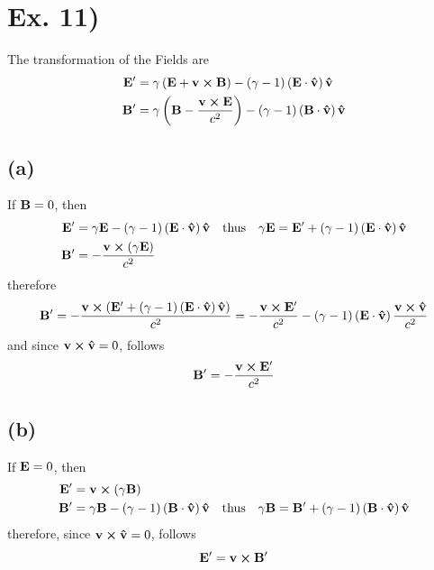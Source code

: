 \documentclass[oneside, 10pt, notitlepage]{book}
\begin{document}
\section*{Ex. 11)}

The transformation of the Fields are
\begin{equation}
\begin{split}
    \vb{E}' &= \gamma \left(\vb{E} + \vb{v}\cross \vb{B}\right) - (\gamma-1)\left(\vb{E}\cdot \vu{v}\right)\vu{v} \\
    \vb{B}' &= \gamma \left(\vb{B}-\frac{\vb{v}\cross\vb{E}}{c^2}\right)-(\gamma-1)\left(\vb{B}\cdot\vu{v}\right)\vu{v}
\end{split}
\end{equation}
\subsection*{(a)}
If \(\vb{B}=0\), then
\begin{equation}
\begin{split}
    \vb{E}' &= \gamma \vb{E} - (\gamma-1)\lr{\vb{E}\cdot \vu{v}}\vu{v} \qq{thus} \gamma \vb{E} = \vb{E}'+ (\gamma-1)\lr{\vb{E}\cdot \vu{v}}\vu{v} \\
    \vb{B}' &= -\frac{\vb{v}\cross\lr{\gamma\vb{E}}}{c^2} 
\end{split}
\end{equation}
therefore
\begin{equation}
    \vb{B}' = -\frac{\vb{v}\cross\left(\vb{E}'+ (\gamma-1)\left(\vb{E}\cdot \vu{v}\right)\vu{v}\right)}{c^2} = -\frac{\vb{v}\cross \vb{E}'}{c^2} - (\gamma-1)\left(\vb{E}\cdot\vu{v}\right)\frac{\vb{v}\cross\vu{v}}{c^2}
\end{equation}
and since \(\vb{v}\cross\vu{v}=0\), follows
\begin{equation}
    \vb{B}' = -\frac{\vb{v}\cross \vb{E}'}{c^2}
\end{equation}

\subsection*{(b)}
If \(\vb{E}=0\), then
\begin{equation}
\begin{split}
    \vb{E}' &= \vb{v}\cross\lr{\gamma\vb{B}} \\
    \vb{B}' &= \gamma \vb{B} - (\gamma-1)\lr{\vb{B}\cdot\vu{v}}\vu{v} \qq{thus} \gamma \vb{B} = \vb{B}'+ (\gamma-1)\lr{\vb{B}\cdot \vu{v}}\vu{v}
\end{split}
\end{equation}
therefore, since \(\vb{v}\cross\vu{v}=0\), follows
\begin{equation}
    \vb{E}' = \vb{v}\cross\vb{B}'
\end{equation}
\end{document}

